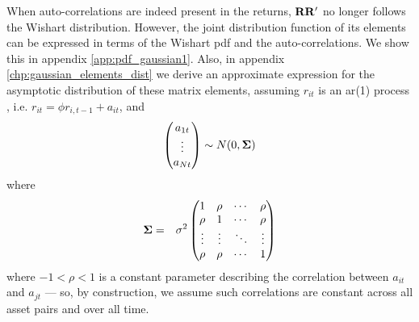 When auto-correlations are indeed present in the returns, $\mathbf{RR'}$
no longer follows the Wishart distribution. However, the joint distribution
function of its elements can be expressed in terms of the Wishart \gls{pdf}
and the auto-correlations. We show this in appendix
\ref{app:pdf_gaussian1}. Also, in appendix
\ref{chp:gaussian_elements_dist} we derive an approximate expression 
for the asymptotic distribution of these matrix elements, assuming
$r_{it}$ is an \gls{ar}(1) process \footnotemark, i.e. $r_{it} =
\phi r_{i, t-1} + a_{it}$, and
\begin{eqnarray*}
  \begin{pmatrix}
    a_{1t} \\
    \vdots \\
    a_{Nt}
  \end{pmatrix} \sim N(0, \mathbf{\Sigma})
\end{eqnarray*}
where
\begin{eqnarray*}
  \mathbf{\Sigma} &=& \sigma^2
  \begin{pmatrix}
    1 & \rho & \cdots & \rho \\
    \rho & 1 & \cdots & \rho \\
    \vdots & \vdots & \ddots & \vdots \\
    \rho & \rho & \cdots & 1
  \end{pmatrix}
\end{eqnarray*}
where $-1 < \rho < 1$ is a constant parameter describing the correlation
between $a_{it}$ and $a_{jt}$ --- so, by construction, we assume such
correlations are constant across all asset pairs and over all
time.

